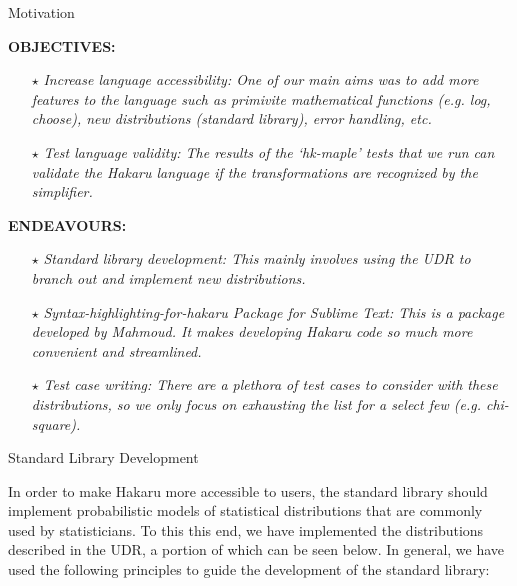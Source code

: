 \documentclass[22pt]{beamer}
\begin{document}
\begin{frame}[fragile]
\begin{textblock}{5}
\begin{textblock}{5}
\begin{block}{Motivation}
\justifying


\tiny{\textbf{OBJECTIVES:}

\begin{itemize}
  \item[\textbf{$\star$}] \textit{Increase language accessibility: One of our main aims was to add more features to the language such as primivite mathematical functions (e.g. log, choose), new distributions (standard library), error handling, etc.}
  \item[\textbf{$\star$}] \textit{Test language validity: The results of the `hk-maple' tests that we run can validate the Hakaru language if the transformations are recognized by the simplifier. }
\end{itemize}
        }

\bigskip

\tiny{\textbf{ENDEAVOURS:}



\begin{itemize}
  \item[\textbf{$\star$}] \textit{Standard library development: This mainly involves using the UDR to branch out and implement new distributions. }
  \item[\textbf{$\star$}] \textit{Syntax-highlighting-for-hakaru Package for Sublime Text: This is a package developed by Mahmoud. It makes developing Hakaru code so much more convenient and streamlined. }
  \item[\textbf{$\star$}] \textit{Test case writing: There are a plethora of test cases to consider with these distributions, so we only focus on exhausting the list for a select few (e.g. chi-square). }
\end{itemize}
        }

\bigskip


\end{block}


\begin{block}{Standard Library Development}
\justifying

\tiny{ In order to make Hakaru more accessible to users, the standard library should implement probabilistic models of statistical distributions that are commonly used by statisticians. To this this end, we have implemented the distributions described in the UDR, a portion of which can be seen below. In general, we have used the following principles to guide the development of the standard library: 


}
\end{block}
\end{textblock}
\end{textblock}
\end{frame}
\end{document}
